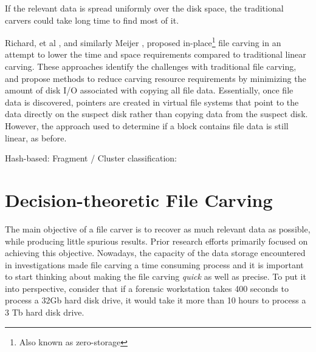 \documentclass[10pt,a4paper]{article}
\begin{document}
 If the relevant data is spread uniformly over the disk space, the traditional carvers could take long time to find most of it.

Richard, et al \cite{Richard2007inplace}, and similarly Meijer \cite{MeijerRob2012}, proposed in-place\footnote{Also known as zero-storage} file carving in an attempt to lower the time and space requirements compared to traditional linear carving. These approaches identify the challenges with traditional file carving, and propose methods to reduce carving resource requirements by minimizing the amount of disk I/O associated with copying all file data. Essentially, once file data is discovered, pointers are created in virtual file systems that point to the data directly on the suspect disk rather than copying data from the suspect disk. However, the approach used to determine if a block contains file data is still linear, as before.

Hash-based: \cite{Garfinkel2015hashbased}
Fragment  / Cluster classification: \cite{Veenman2007statistical} \cite{li2011novel}
%


\section{Decision-theoretic File Carving}

The main objective of a file carver is to recover as much relevant data as possible, while producing little spurious results. Prior research efforts primarily focused on achieving this objective. Nowadays, the capacity of the data storage encountered in investigations made file carving a time consuming process and it is important to start thinking about making the file carving \emph{quick} as well as precise. To put it into perspective, consider that if a forensic workstation takes 400 seconds to process a 32Gb hard disk drive, it would take it more than 10 hours to process a 3 Tb hard disk drive. 
\end{document}
